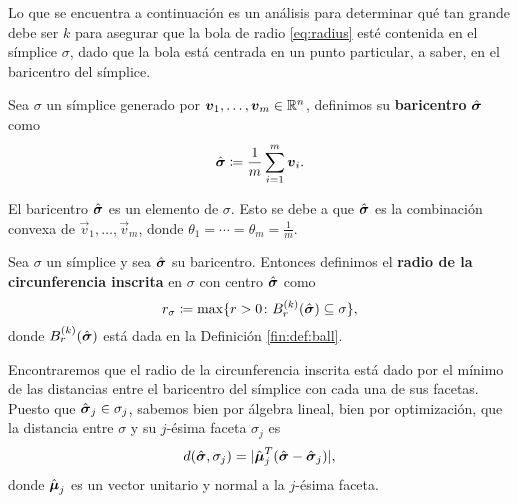 Lo que se encuentra a continuación es un análisis para determinar qué tan grande debe ser $k$ para
asegurar que la bola de radio \eqref{eq:radius} esté contenida en el símplice $\sigma$, dado que la
bola está centrada en un punto particular, a saber, en el baricentro del símplice.

\begin{definition}
	Sea $\sigma$ un símplice generado por $\boldsymbol{v}_1, \ldots, \boldsymbol{v}_m \in \mathbb{R}^n$, definimos su
	\textbf{baricentro} $\hat{\boldsymbol{ \sigma }}$ como
	\begin{equation*}
		\hat{\boldsymbol{ \sigma }} \coloneq \frac{1}{m} \sum_{i=1}^{m}\boldsymbol{v}_i.
	\end{equation*}
\end{definition}
\begin{observation}
	El baricentro $\hat{\boldsymbol{ \sigma }}$ es un elemento de $\sigma$. Esto se debe a que $\hat{\boldsymbol{ \sigma }}$ es la
	combinación convexa de $\vec{v}_1, \ldots, \vec{v}_m$, donde $\theta_1 = \cdots = \theta_m =
	\frac{1}{m}$.
\end{observation}

\begin{definition}
	\label{def:r-sigma}
	Sea $\sigma$ un símplice y sea $\hat{\boldsymbol{ \sigma }}$ su baricentro. Entonces definimos el \textbf{radio
	de la circunferencia inscrita} en $\sigma$ con centro $\hat{\boldsymbol{ \sigma }}$ como
	\begin{equation}
		\label{eq:def:r-sigma}
		r_\sigma \coloneq \max \lbrace r > 0 \colon B_r^{(k)}(\hat{\boldsymbol{ \sigma }})
		\subseteq \sigma \rbrace,
	\end{equation}
	donde $B_r^{(k)}(\hat{\boldsymbol{ \sigma }})$ está dada en la Definición \ref{fin:def:ball}.
\end{definition}

Encontraremos que el radio de la circunferencia inscrita está dado por el mínimo de las distancias
entre el baricentro del símplice con cada una de sus facetas. Puesto que $\hat{\boldsymbol{ \sigma }}_j \in
\sigma_j$, sabemos bien por álgebra lineal, bien por optimización, que la distancia entre $\sigma$ y
su $j$-ésima faceta $\sigma_j$ es
\begin{equation}
	\label{eq:dist:v1}
	d(\hat{\boldsymbol{ \sigma }}, \sigma_j) = |\hat{\boldsymbol{\mu}}_j^T(\hat{\boldsymbol{ \sigma }} - \hat{\boldsymbol{ \sigma }}_j)|,
\end{equation}
donde $\hat{\boldsymbol{\mu}}_j$ es un vector unitario y normal a la $j$-ésima faceta.

